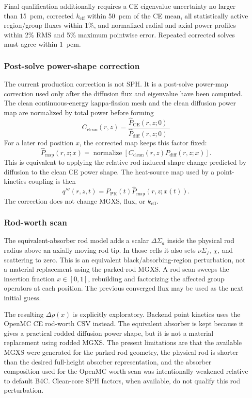\documentclass[11pt]{article}
\begin{document}
Final qualification additionally requires a CE eigenvalue uncertainty no
larger than 15~pcm, corrected $k_{\mathrm{eff}}$ within 50~pcm of the CE mean,
all statistically active region/group fluxes within 1\%, and normalized radial
and axial power profiles within 2\% RMS and 5\% maximum pointwise error.
Repeated corrected solves must agree within 1~pcm.

\subsubsection{Post-solve power-shape correction}

The current production correction is not SPH.  It is a post-solve power-map
correction used only after the diffusion flux and eigenvalue have been
computed.  The clean continuous-energy kappa-fission mesh and the clean
diffusion power map are normalized by total power before forming
\[
C_{\mathrm{clean}}(r,z)
= \frac{\widehat{P}_{\mathrm{CE}}(r,z;0)}
       {\widehat{P}_{\mathrm{diff}}(r,z;0)} .
\]
For a later rod position $x$, the corrected map keeps this factor fixed:
\[
\widehat{P}_{\mathrm{map}}(r,z;x)
= \operatorname{normalize}\left[
  C_{\mathrm{clean}}(r,z) P_{\mathrm{diff}}(r,z;x)
\right].
\]
This is equivalent to applying the relative rod-induced shape change predicted
by diffusion to the clean CE power shape.  The heat-source map used by a
point-kinetics coupling is then
\[
q'''(r,z,t)
= P_{\mathrm{PK}}(t)\widehat{P}_{\mathrm{map}}(r,z;x(t)).
\]
The correction does not change MGXS, flux, or $k_{\mathrm{eff}}$.

\subsubsection{Rod-worth scan}

The equivalent-absorber rod model adds a scalar $\Delta\Sigma_a$ inside the
physical rod radius above an axially moving rod tip.  In those cells it also
sets $\nu\Sigma_f$, $\chi$, and scattering to zero.  This is an equivalent
black/absorbing-region perturbation, not a material replacement using the
parked-rod MGXS.  A rod scan sweeps the insertion fraction
$x \in [0,1]$, rebuilding and factorizing the affected group operators at each
position.  The previous converged flux may be used as the next initial guess.

The resulting $\Delta\rho(x)$ is explicitly exploratory.  Backend point
kinetics uses the OpenMC CE rod-worth CSV instead.  The equivalent absorber is
kept because it gives a practical rodded diffusion power shape, but it is not a
material replacement using rodded MGXS.  The present limitations are that the
available MGXS were generated for the parked rod geometry, the physical rod is
shorter than the desired full-height absorber representation, and the absorber
composition used for the OpenMC worth scan was intentionally weakened relative
to default B4C.  Clean-core SPH factors, when available, do not qualify this
rod perturbation.
\end{document}

